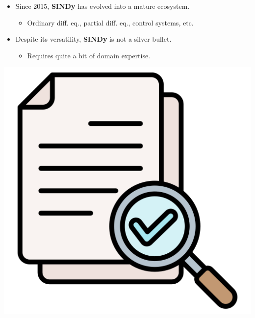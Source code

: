 \documentclass[aspectratio=169,compress,12pt,dvipsnames]{beamer}
\begin{document}
\begin{frame}
    \vfill
    \begin{minipage}{.68\textwidth}
        \begin{itemize}
            \item Since 2015, \textbf{SINDy} has evolved into a mature ecosystem.
            \begin{itemize}
                \item Ordinary diff. eq., partial diff. eq., control systems, etc.
            \end{itemize}
            \par\bigskip
            \item Despite its versatility, \textbf{SINDy} is not a silver bullet.
            \begin{itemize}
                \item Requires quite a bit of domain expertise.
            \end{itemize}
        \end{itemize}
    \end{minipage}%
    \hfill
    \begin{minipage}{.28\textwidth}
        \centering
        \includegraphics[width=\textwidth]{imgs/conclusion.png}
    \end{minipage}
    \vfill
\end{frame}
\end{document}
